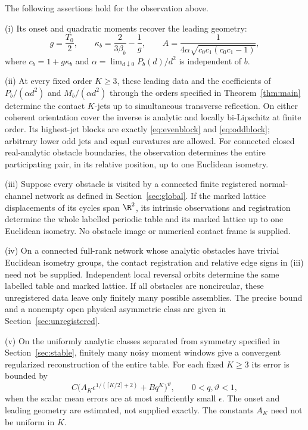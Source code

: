 \begin{theorem}
\label{thm:intrinsic}
The following assertions hold for the observation above.

\smallskip\noindent
\textup{(i)} Its onset and quadratic moments recover the leading geometry:
\begin{equation}\label{eq:calibrationmain}
 g=\frac{T_0}{2},\qquad
 \kappa_b=\frac{2}{3\beta_b}-\frac1g,\qquad
 A=\frac1{4\alpha\sqrt{c_0c_1(c_0c_1-1)}},
\end{equation}
where $c_b=1+g\kappa_b$ and
$\alpha=\lim_{d\downarrow0}P_b(d)/d^2$ is independent of $b$.

\smallskip\noindent
\textup{(ii)} At every fixed order $K\ge3$, these leading data and the
coefficients of $P_b/(\alpha d^2)$ and $M_b/(\alpha d^2)$ through the
orders specified in Theorem~\ref{thm:main} determine the contact $K$-jets
up to simultaneous transverse reflection. On either coherent orientation
cover the inverse is analytic and locally bi-Lipschitz at finite order.
Its highest-jet blocks are exactly \eqref{eq:evenblock} and
\eqref{eq:oddblock}; arbitrary lower odd jets and equal curvatures are
allowed. For connected closed real-analytic obstacle boundaries, the
observation determines the entire participating pair, in its relative
position, up to one Euclidean isometry.

\smallskip\noindent
\textup{(iii)} Suppose every obstacle is visited by a connected finite
registered normal-channel network as defined in
Section~\ref{sec:global}. If the marked lattice displacements of its
cycles span $\R^2$, its intrinsic observations and registration determine
the whole labelled periodic table and its marked lattice up to one
Euclidean isometry. No obstacle image or numerical contact frame is
supplied.

\smallskip\noindent
\textup{(iv)} On a connected full-rank network whose analytic obstacles
have trivial Euclidean isometry groups, the contact registration and
relative edge signs in (iii) need not be supplied. Independent local
reversal orbits determine the same labelled table and marked lattice.
If all obstacles are noncircular, these unregistered data leave only
finitely many possible assemblies. The precise bound and a nonempty
open physical asymmetric class are given in Section~\ref{sec:unregistered}.

\smallskip\noindent
\textup{(v)} On the uniformly analytic classes separated from symmetry
specified in Section~\ref{sec:stable}, finitely many noisy moment
windows give a convergent regularized reconstruction of the entire table.
For each fixed $K\ge3$ its error is bounded by
\[
 C\bigl(A_K\epsilon^{1/(\lceil K/2\rceil+2)}+Bq^K\bigr)^\vartheta,
       \qquad 0<q,\vartheta<1,
\]
when the scalar mean errors are at most sufficiently small $\epsilon$.
The onset and leading geometry are estimated, not supplied exactly.
The constants $A_K$ need not be uniform in $K$.
\end{theorem}

